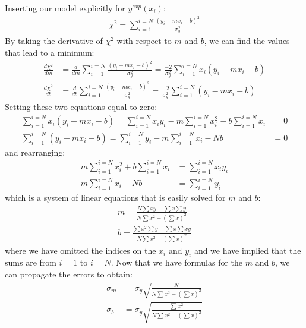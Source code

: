 Inserting our model explicitly for $y^{exp}(x_i)$:
\begin{align}
\chi^2=\sum_{i=1}^{i=N}\frac{(y_i-mx_i-b)^2}{\sigma_{y}^2}
\end{align}
By taking the derivative of $\chi^2$ with respect to $m$ and $b$, we can find the values that lead to a minimum:
\begin{align}
\frac{d\chi^2}{dm}&=\frac{d}{dm}\sum_{i=1}^{i=N}\frac{(y_i-mx_i-b)^2}{\sigma_{y}^2}=\frac{-2}{\sigma_y^2}\sum_{i=1}^{i=N}x_i(y_i-mx_i-b)\\
\frac{d\chi^2}{db}&=\frac{d}{db}\sum_{i=1}^{i=N}\frac{(y_i-mx_i-b)^2}{\sigma_{y}^2}=\frac{-2}{\sigma_y^2}\sum_{i=1}^{i=N}(y_i-mx_i-b)
\end{align}
Setting these two equations equal to zero:
\begin{align}
\sum_{i=1}^{i=N}x_i(y_i-mx_i-b)=\sum_{i=1}^{i=N}x_iy_i-m\sum_{i=1}^{i=N}x_i^2-b\sum_{i=1}^{i=N}x_i&=0\\
\sum_{i=1}^{i=N}(y_i-mx_i-b)=\sum_{i=1}^{i=N}y_i-m\sum_{i=1}^{i=N}x_i-Nb&=0
\end{align}
and rearranging:
\begin{align}
m\sum_{i=1}^{i=N}x_i^2+b\sum_{i=1}^{i=N}x_i&=\sum_{i=1}^{i=N}x_iy_i\\
m\sum_{i=1}^{i=N}x_i+Nb&=\sum_{i=1}^{i=N}y_i
\end{align}
which is a system of linear equations that is easily solved for $m$ and $b$:
\begin{align}
\label{eqn:LSmb}
m=\frac{N\sum xy-\sum x\sum y}{N\sum x^2-\left(\sum x\right)^2}\nonumber\\
b=\frac{\sum x^2\sum y-\sum x \sum xy}{N\sum x^2-\left(\sum x\right)^2}
\end{align}
where we have omitted the indices on the $x_i$ and $y_i$ and we have implied that the sums are from $i=1$ to $i=N$. Now that we have formulas for the $m$ and $b$, we can propagate the errors to obtain:
\begin{align}
\label{eqn:LSmberror}
\sigma_m&=\sigma_y\sqrt{\frac{N}{N\sum x^2-\left(\sum x\right)^2}}\nonumber\\
\sigma_b&=\sigma_y\sqrt{\frac{\sum x^2}{N\sum x^2-\left(\sum x\right)^2}}
\end{align}


